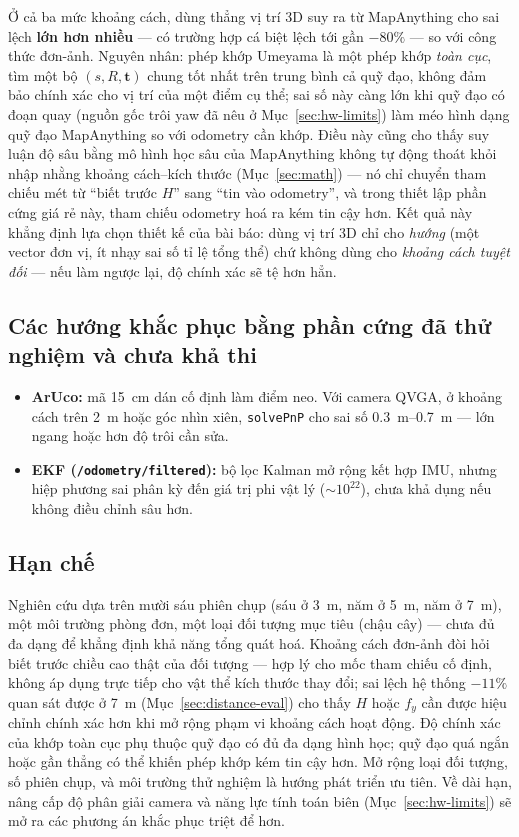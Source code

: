 \documentclass[10pt,a4paper,twocolumn]{article}
\begin{document}
Ở cả ba mức khoảng cách, dùng thẳng vị trí 3D suy ra từ MapAnything cho sai lệch \textbf{lớn hơn nhiều} — có trường hợp cá biệt lệch tới gần $-80\%$ — so với công thức đơn-ảnh. Nguyên nhân: phép khớp Umeyama là một phép khớp \emph{toàn cục}, tìm một bộ $(s,R,\mathbf{t})$ chung tốt nhất trên trung bình cả quỹ đạo, không đảm bảo chính xác cho vị trí của một điểm cụ thể; sai số này càng lớn khi quỹ đạo có đoạn quay (nguồn gốc trôi yaw đã nêu ở Mục~\ref{sec:hw-limits}) làm méo hình dạng quỹ đạo MapAnything so với odometry cần khớp. Điều này cũng cho thấy suy luận độ sâu bằng mô hình học sâu của MapAnything không tự động thoát khỏi nhập nhằng khoảng cách--kích thước (Mục~\ref{sec:math}) — nó chỉ chuyển tham chiếu mét từ ``biết trước $H$'' sang ``tin vào odometry'', và trong thiết lập phần cứng giá rẻ này, tham chiếu odometry hoá ra kém tin cậy hơn. Kết quả này khẳng định lựa chọn thiết kế của bài báo: dùng vị trí 3D chỉ cho \emph{hướng} (một vector đơn vị, ít nhạy sai số tỉ lệ tổng thể) chứ không dùng cho \emph{khoảng cách tuyệt đối} — nếu làm ngược lại, độ chính xác sẽ tệ hơn hẳn.

\subsection{Các hướng khắc phục bằng phần cứng đã thử nghiệm và chưa khả thi}
\label{sec:hw-alternatives}

\begin{itemize}[leftmargin=*,itemsep=0.2em]
    \item \textbf{ArUco:} mã \SI{15}{\centi\meter} dán cố định làm điểm neo. Với camera QVGA, ở khoảng cách trên \SI{2}{\meter} hoặc góc nhìn xiên, \texttt{solvePnP} cho sai số \SIrange{0.3}{0.7}{\meter} — lớn ngang hoặc hơn độ trôi cần sửa.
    \item \textbf{EKF (\texttt{/odometry/filtered}):} bộ lọc Kalman mở rộng kết hợp IMU, nhưng hiệp phương sai phân kỳ đến giá trị phi vật lý ($\sim 10^{22}$), chưa khả dụng nếu không điều chỉnh sâu hơn.
\end{itemize}

\subsection{Hạn chế}
\label{sec:limitations}

Nghiên cứu dựa trên mười sáu phiên chụp (sáu ở \SI{3}{\meter}, năm ở \SI{5}{\meter}, năm ở \SI{7}{\meter}), một môi trường phòng đơn, một loại đối tượng mục tiêu (chậu cây) — chưa đủ đa dạng để khẳng định khả năng tổng quát hoá. Khoảng cách đơn-ảnh đòi hỏi biết trước chiều cao thật của đối tượng — hợp lý cho mốc tham chiếu cố định, không áp dụng trực tiếp cho vật thể kích thước thay đổi; sai lệch hệ thống $-11\%$ quan sát được ở \SI{7}{\meter} (Mục~\ref{sec:distance-eval}) cho thấy $H$ hoặc $f_y$ cần được hiệu chỉnh chính xác hơn khi mở rộng phạm vi khoảng cách hoạt động. Độ chính xác của khớp toàn cục phụ thuộc quỹ đạo có đủ đa dạng hình học; quỹ đạo quá ngắn hoặc gần thẳng có thể khiến phép khớp kém tin cậy hơn. Mở rộng loại đối tượng, số phiên chụp, và môi trường thử nghiệm là hướng phát triển ưu tiên. Về dài hạn, nâng cấp độ phân giải camera và năng lực tính toán biên (Mục~\ref{sec:hw-limits}) sẽ mở ra các phương án khắc phục triệt để hơn.
\end{document}
